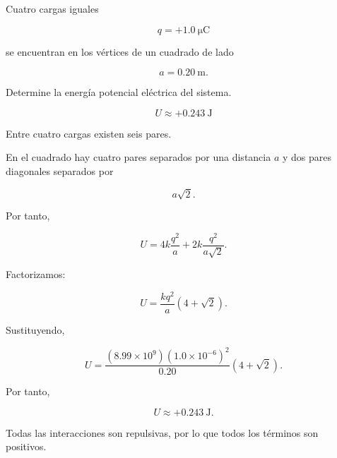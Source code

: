 \begin{ejercicio}

Cuatro cargas iguales

\[
q=+\SI{1.0}{\micro\coulomb}
\]

se encuentran en los vértices de un cuadrado de lado

\[
a=\SI{0.20}{\metre}.
\]

Determine la energía potencial eléctrica del sistema.

\begin{center}
\end{center}

\end{ejercicio}

\begin{respuesta}

\[
\boxed{U\approx+\SI{0.243}{\joule}}
\]

\end{respuesta}

\begin{explicacion}

Entre cuatro cargas existen seis pares.

En el cuadrado hay cuatro pares separados por una distancia \(a\) y dos pares
diagonales separados por

\[
a\sqrt2.
\]

Por tanto,

\[
U
=
4k\frac{q^2}{a}
+
2k\frac{q^2}{a\sqrt2}.
\]

Factorizamos:

\[
U
=
\frac{kq^2}{a}
\left(
4+\sqrt2
\right).
\]

Sustituyendo,

\[
U
=
\frac{(8.99\times10^9)(1.0\times10^{-6})^2}{0.20}
(4+\sqrt2).
\]

Por tanto,

\[
\boxed{U\approx+\SI{0.243}{\joule}}.
\]

Todas las interacciones son repulsivas, por lo que todos los términos son positivos.

\end{explicacion}


